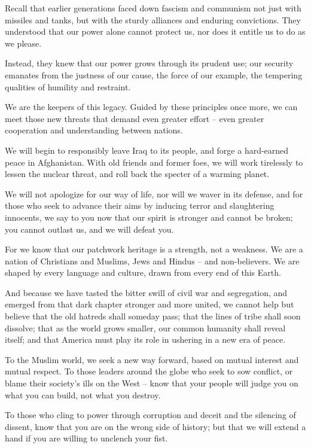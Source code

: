 Recall that earlier generations faced down fascism and communism not just with missiles and tanks, but with the sturdy alliances and enduring convictions. 
They understood that our power alone cannot protect us, nor does it entitle us to do as we please.

Instead, they knew that our power grows through its prudent use; our security emanates from the justness of our cause, the force of our example, 
the tempering qualities of humility and restraint.

We are the keepers of this legacy. Guided by these principles once more, we can meet those new threats that demand even greater effort – even greater 
cooperation and understanding between nations.

We will begin to responsibly leave Iraq to its people, and forge a hard-earned peace in Afghanistan. With old friends and former foes, we will work tirelessly 
to lessen the nuclear threat, and roll back the specter of a warming planet.


We will not apologize for our way of life, nor will we waver in its defense, and for those who seek to advance their aims by inducing terror and slaughtering 
innocents, we say to you now that our spirit is stronger and cannot be broken; you cannot outlast us, and we will defeat you.

For we know that our patchwork heritage is a strength, not a weakness. We are a nation of Christians and Muslims, Jews and Hindus – and non-believers. We 
are shaped by every language and culture, drawn from every end of this Earth.

And because we have tasted the bitter swill of civil war and segregation, and emerged from that dark chapter stronger and more united, we cannot help but 
believe that the old hatreds shall someday pass; that the lines of tribe shall soon dissolve; that as the world grows smaller, our common humanity shall 
reveal itself; and that America must play its role in ushering in a new era of peace.

To the Muslim world, we seek a new way forward, based on mutual interest and mutual respect. To those leaders around the globe who seek to sow conflict, 
or blame their society’s ills on the West – know that your people will judge you on what you can build, not what you destroy.


To those who cling to power through corruption and deceit and the silencing of dissent, know that you are on the wrong side of history; but that we will 
extend a hand if you are willing to unclench your fist.

